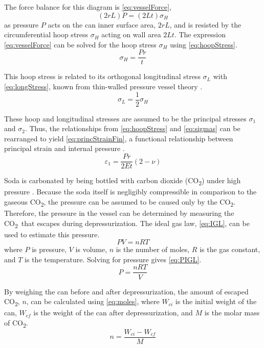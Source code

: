 \documentclass[10pt,journal,letterpaper]{IEEEtran}
\newcommand{\co}{CO\textsubscript{2}}
\begin{document}
The force balance for this diagram is \eqref{eq:vesselForce},
\begin{equation}
\label{eq:vesselForce}
(2rL)P=(2Lt)\sigma_H
\end{equation}
as pressure $P$ acts on the can inner surface area, $2rL$, and is resisted by the circumferential hoop stress $\sigma_H$ acting on wall area $2Lt$.
The expression \eqref{eq:vesselForce} can be solved for the hoop stress $\sigma_H$ using \eqref{eq:hoopStress}.
\begin{equation}
\label{eq:hoopStress}
\sigma_H=\frac{Pr}{t}
\end{equation}

This hoop stress is related to its orthogonal longitudinal stress $\sigma_L$ with \eqref{eq:longStress}, known from thin-walled pressure vessel theory \cite{b1}.
\begin{equation}
\label{eq:longStress}
\sigma_L=\frac{1}{2}\sigma_H
\end{equation}

These hoop and longitudinal stresses are assumed to be the principal stresses $\sigma_1$ and $\sigma_2$.
Thus, the relationships from \eqref{eq:hoopStress} and \eqref{eq:sigmas} can be rearranged to yield \eqref{eq:princStrainFin}, a functional relationship between principal strain and internal pressure \cite{b1}.
\begin{equation}
\label{eq:princStrainFin}
\varepsilon_1=\frac{Pr}{2Et}(2-\nu)
\end{equation}

Soda is carbonated by being bottled with carbon dioxide (\co) under high pressure \cite{b9}.
Because the soda itself is negligibly compressible in comparison to the gaseous \co , the pressure can be assumed to be caused only by the \co .
Therefore, the pressure in the vessel can be determined by measuring the \co\ that escapes during depressurization.
The ideal gas law, \eqref{eq:IGL}, can be used to estimate this pressure.
\begin{equation}
\label{eq:IGL}
PV=nRT
\end{equation}
where $P$ is pressure, $V$ is volume, $n$ is the number of moles, $R$ is the gas constant, and $T$ is the temperature.
Solving for pressure gives \eqref{eq:PIGL}.
\begin{equation}
\label{eq:PIGL}
P = \frac{nRT}{V}
\end{equation}

By weighing the can before and after depressurization, the amount of escaped \co, $n$, can be calculated using \eqref{eq:moles}, where $W_{ci}$ is the initial weight of the can, $W_{cf}$ is the weight of the can after depressurization, and $M$ is the molar mass of \co.
\begin{equation}
\label{eq:moles}
n=\frac{W_{ci}-W_{cf}}{M}
\end{equation}
\end{document}
